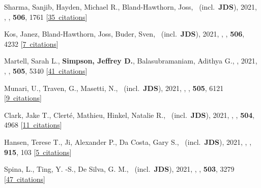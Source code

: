 \item[{\color{numcolor}\scriptsize60}] Sharma, Sanjib, Hayden, Michael R., Bland-Hawthorn, Joss, \etal\ (incl.\ \textbf{JDS}), 2021, , \mnras, \textbf{506}, 1761 [\href{https://ui.adsabs.harvard.edu/#abs/2021MNRAS.506.1761S}{35~citations}]

\item[{\color{numcolor}\scriptsize59}] Kos, Janez, Bland-Hawthorn, Joss, Buder, Sven, \etal\ (incl.\ \textbf{JDS}), 2021, , \mnras, \textbf{506}, 4232 [\href{https://ui.adsabs.harvard.edu/#abs/2021MNRAS.506.4232K}{7~citations}]

\item[{\color{numcolor}\scriptsize58}] Martell, Sarah L., \textbf{Simpson, Jeffrey D.}, Balasubramaniam, Adithya G., \etal, 2021, , \mnras, \textbf{505}, 5340 [\href{https://ui.adsabs.harvard.edu/#abs/2021MNRAS.505.5340M}{41~citations}]

\item[{\color{numcolor}\scriptsize57}] Munari, U., Traven, G., Masetti, N., \etal\ (incl.\ \textbf{JDS}), 2021, , \mnras, \textbf{505}, 6121 [\href{https://ui.adsabs.harvard.edu/#abs/2021MNRAS.505.6121M}{9~citations}]

\item[{\color{numcolor}\scriptsize56}] Clark, Jake T., Clert{\'e}, Mathieu, Hinkel, Natalie R., \etal\ (incl.\ \textbf{JDS}), 2021, , \mnras, \textbf{504}, 4968 [\href{https://ui.adsabs.harvard.edu/#abs/2021MNRAS.504.4968C}{11~citations}]

\item[{\color{numcolor}\scriptsize55}] Hansen, Terese T., Ji, Alexander P., Da Costa, Gary S., \etal\ (incl.\ \textbf{JDS}), 2021, , \apj, \textbf{915}, 103 [\href{https://ui.adsabs.harvard.edu/#abs/2021ApJ...915..103H}{5~citations}]

\item[{\color{numcolor}\scriptsize54}] Spina, L., Ting, Y. -S., De Silva, G. M., \etal\ (incl.\ \textbf{JDS}), 2021, , \mnras, \textbf{503}, 3279 [\href{https://ui.adsabs.harvard.edu/#abs/2021MNRAS.503.3279S}{47~citations}]

